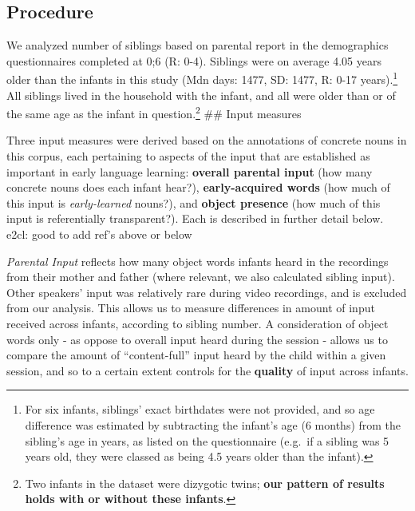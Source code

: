 \documentclass[
  english,
  man,floatsintext]{apa6}
\begin{document}
\hypertarget{procedure}{%
\subsection{Procedure}\label{procedure}}

We analyzed number of siblings based on parental report in the demographics questionnaires completed at 0;6 (R: 0-4). Siblings were on average 4.05 years older than the infants in this study (Mdn days: 1477, SD: 1477, R: 0-17 years).\footnote{For six infants, siblings' exact birthdates were not provided, and so age difference was estimated by subtracting the infant's age (6 months) from the sibling's age in years, as listed on the questionnaire (e.g.~if a sibling was 5 years old, they were classed as being 4.5 years older than the infant).} All siblings lived in the household with the infant, and all were older than or of the same age as the infant in question.\footnote{Two infants in the dataset were dizygotic twins; \textbf{our pattern of results holds with or without these infants}.}
\#\# Input measures

Three input measures were derived based on the annotations of concrete nouns in this corpus, each pertaining to aspects of the input that are established as important in early language learning: \textbf{overall parental input} (how many concrete nouns does each infant hear?), \textbf{early-acquired words} (how much of this input is \emph{early-learned} nouns?), and \textbf{object presence} (how much of this input is referentially transparent?). Each is described in further detail below.
e2cl: good to add ref's above or below

\emph{Parental Input} reflects how many object words infants heard in the recordings from their mother and father (where relevant, we also calculated sibling input). Other speakers' input was relatively rare during video recordings, and is excluded from our analysis. This allows us to measure differences in amount of input received across infants, according to sibling number. A consideration of object words only - as oppose to overall input heard during the session - allows us to compare the amount of \enquote{content-full} input heard by the child within a given session, and so to a certain extent controls for the \textbf{quality} of input across infants.
\end{document}
